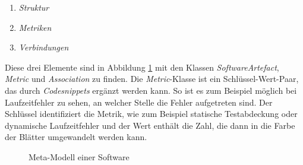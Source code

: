 \begin{enumerate}
  \item \textit{Struktur}
  \item \textit{Metriken}
  \item \textit{Verbindungen}
\end{enumerate}

Diese drei Elemente sind in Abbildung \ref{fig:meta-model} mit den Klassen \textit{SoftwareArtefact}, \textit{Metric} und \textit{Association} zu finden. Die \textit{Metric}-Klasse ist ein Schlüssel-Wert-Paar, das durch \textit{Codesnippets} ergänzt werden kann. So ist es zum Beispiel möglich bei Laufzeitfehler zu sehen, an welcher Stelle die Fehler aufgetreten sind. Der Schlüssel identifiziert die Metrik, wie zum Beispiel statische Testabdeckung oder dynamische Laufzeitfehler und der Wert enthält die Zahl, die dann in die Farbe der Blätter umgewandelt werden kann.


\begin{figure}[htb]
\caption{Meta-Modell einer Software}
\label{fig:meta-model}
\end{figure}

